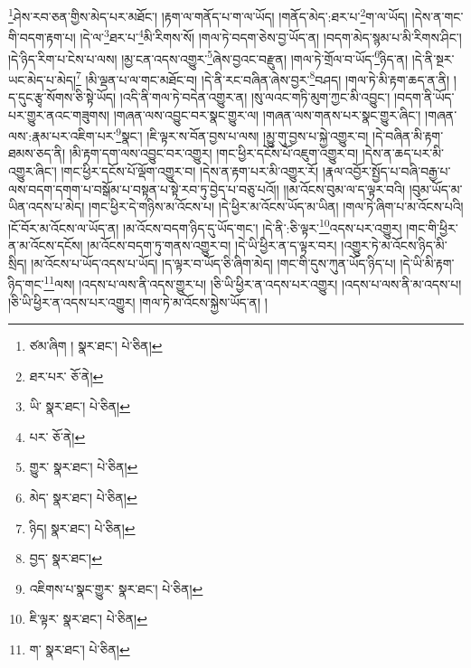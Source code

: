 \footnote{ཙམ་ཞིག །  སྣར་ཐང་།  པེ་ཅིན། }ཤེས་རབ་ཅན་གྱིས་མེད་པར་མཐོང་། །རྟག་ལ་གནོད་པ་ག་ལ་ཡོད། །གནོད་མེད་:ཐར་པ་\footnote{ཐར་པར་  ཅོ་ནེ། }ག་ལ་ཡོད། །དེས་ན་གང་གི་བདག་རྟག་པ། །དེ་ལ་\footnote{ཡི་  སྣར་ཐང་།  པེ་ཅིན། }ཐར་པ་\footnote{པར་  ཅོ་ནེ། }མི་རིགས་སོ། །གལ་ཏེ་བདག་ཅེས་བྱ་ཡོད་ན། །བདག་མེད་སྙམ་པ་མི་རིགས་ཤིང་། །དེ་ཉིད་རིག་པ་ངེས་པ་ལས། །མྱ་ངན་འདས་འགྱུར་\footnote{གྱུར་  སྣར་ཐང་།  པེ་ཅིན། }ཞེས་བྱའང་བརྫུན། །གལ་ཏེ་གྲོལ་བ་ཡོད་\footnote{མེད་  སྣར་ཐང་།  པེ་ཅིན། }ཉིད་ན། །དེ་ནི་སྔར་ཡང་མེད་པ་མེད།\footnote{ཉིད།  སྣར་ཐང་།  པེ་ཅིན། } །མི་ལྡན་པ་ལ་གང་མཐོང་བ། །དེ་ནི་རང་བཞིན་ཞེས་བྱར་\footnote{བྱད་  སྣར་ཐང་། }བཤད། །གལ་ཏེ་མི་རྟག་ཆད་ན་ནི། །ད་དུང་རྩྭ་སོགས་ཅི་སྟེ་ཡོད། །འདི་ནི་གལ་ཏེ་བདེན་འགྱུར་ན། །སུ་ལའང་གཏི་མུག་ཀྱང་མི་འབྱུང་། །བདག་ནི་ཡོད་པར་གྱུར་ནའང་གཟུགས། །གཞན་ལས་འབྱུང་བར་སྣང་གྱུར་ལ། །གཞན་ལས་གནས་པར་སྣང་གྱུར་ཞིང་། །གཞན་ལས་:རྣམ་པར་འཇིག་པར་\footnote{འཇིགས་པ་སྣང་གྱུར་  སྣར་ཐང་།  པེ་ཅིན། }སྣང་། །ཇི་ལྟར་ས་བོན་བྱས་པ་ལས། །མྱུ་གུ་བྱས་པ་སྐྱེ་འགྱུར་བ། །དེ་བཞིན་མི་རྟག་ཐམས་ཅད་ནི། །མི་རྟག་དག་ལས་འབྱུང་བར་འགྱུར། །གང་ཕྱིར་དངོས་པོ་འཇུག་འགྱུར་བ། །དེས་ན་ཆད་པར་མི་འགྱུར་ཞིང་། །གང་ཕྱིར་དངོས་པོ་ལྡོག་འགྱུར་བ། །དེས་ན་རྟག་པར་མི་འགྱུར་རོ། །རྣལ་འབྱོར་སྤྱོད་པ་བཞི་བརྒྱ་པ་ལས་བདག་དགག་པ་བསྒོམ་པ་བསྟན་པ་སྟེ་རབ་ཏུ་བྱེད་པ་བཅུ་པའོ།། །།མ་འོངས་བུམ་ལ་ད་ལྟར་བའི། །བུམ་ཡོད་མ་ཡིན་འདས་པ་མེད། །གང་ཕྱིར་དེ་གཉིས་མ་འོངས་པ། །དེ་ཕྱིར་མ་འོངས་ཡོད་མ་ཡིན། །གལ་ཏེ་ཞིག་པ་མ་འོངས་པའི། །ངོ་བོར་མ་འོངས་ལ་ཡོད་ན། །མ་འོངས་བདག་ཉིད་དུ་ཡོད་གང་། །དེ་ནི་:ཅི་ལྟར་\footnote{ཇི་ལྟར་  སྣར་ཐང་།  པེ་ཅིན། }འདས་པར་འགྱུར། །གང་གི་ཕྱིར་ན་མ་འོངས་དངོས། །མ་འོངས་བདག་ཏུ་གནས་འགྱུར་བ། །དེ་ཡི་ཕྱིར་ན་ད་ལྟར་བར། །འགྱུར་ཏེ་མ་འོངས་ཉིད་མི་སྲིད། །མ་འོངས་པ་ཡོད་འདས་པ་ཡོད། །ད་ལྟར་བ་ཡོད་ཅི་ཞིག་མེད། །གང་གི་དུས་ཀུན་ཡོད་ཉིད་པ། །དེ་ཡི་མི་རྟག་ཉིད་གང་\footnote{ག་  སྣར་ཐང་།  པེ་ཅིན། }ལས། །འདས་པ་ལས་ནི་འདས་གྱུར་པ། །ཅི་ཡི་ཕྱིར་ན་འདས་པར་འགྱུར། །འདས་པ་ལས་ནི་མ་འདས་པ། །ཅི་ཡི་ཕྱིར་ན་འདས་པར་འགྱུར། །གལ་ཏེ་མ་འོངས་སྐྱེས་ཡོད་ན། །

